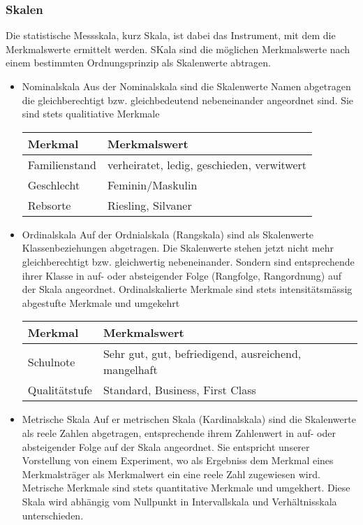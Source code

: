 \subsubsection{Skalen}
\begin{tcolorbox}[colback=green!5,colframe=green!40!black,title=Skalen]
Die statistische Messskala, kurz Skala, ist dabei das Instrument, mit dem die Merkmalswerte ermittelt werden. SKala sind die möglichen Merkmalswerte nach einem bestimmten Ordnungsprinzip als Skalenwerte abtragen.
\end{tcolorbox}
\begin{itemize}
\item Nominalskala
\subitem Aus der Nominalskala sind die Skalenwerte Namen abgetragen die gleichberechtigt bzw. gleichbedeutend nebeneinander angeordnet sind. Sie sind stets qualitiative Merkmale
\begin{table}[ht]
\centering
\begin{tabular}{@{}ll@{}}
\toprule
Merkmal & Merkmalswert \\ \midrule
Familienstand & verheiratet, ledig, geschieden, verwitwert \\
Geschlecht & Feminin/Maskulin \\
Rebsorte & Riesling, Silvaner \\ \bottomrule
\end{tabular}
\end{table}
\item Ordinalskala
\subitem Auf der Ordnialskala (Rangskala) sind als Skalenwerte Klassenbeziehungen abgetragen. Die Skalenwerte stehen jetzt nicht mehr gleichberechtigt bzw. gleichwertig nebeneinander. Sondern sind entsprechende ihrer Klasse in auf- oder absteigender Folge (Rangfolge, Rangordnung) auf der Skala angeordnet. Ordinalskalierte Merkmale sind stets intensitätsmässig abgestufte Merkmale und umgekehrt
\begin{table}[ht]
\centering
\begin{tabular}{@{}ll@{}}
\toprule
Merkmal & Merkmalswert \\ \midrule
Schulnote & Sehr gut, gut, befriedigend, ausreichend, mangelhaft \\
Qualitätstufe & Standard, Business, First Class \\ \bottomrule
\end{tabular}
\end{table}
\item Metrische Skala
\subitem Auf er metrischen Skala (Kardinalskala) sind die Skalenwerte als reele Zahlen abgetragen, entsprechende ihrem Zahlenwert in auf- oder absteigender Folge auf der Skala angeordnet. Sie entspricht unserer Vorstellung von einem Experiment, wo als Ergebniss dem Merkmal eines Merkmalsträger als Merkmalwert ein eine reele Zahl zugewiesen wird. Metrische Merkmale sind stets quantitative Merkmale und umgekhert. Diese Skala wird abhängig vom Nullpunkt in Intervallskala und Verhältnisskala unterschieden.

\end{itemize}
